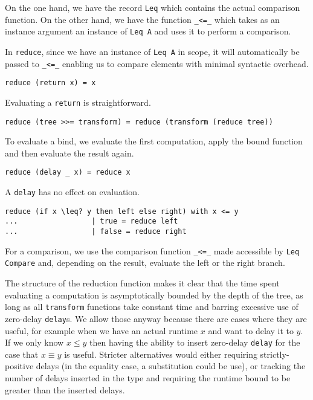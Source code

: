 On the one hand, we have the record \texttt{Leq} which contains the actual comparison function. On the other hand, we have the function \texttt{\_<=\_} which takes as an instance argument an instance of \texttt{Leq A} and uses it to perform a comparison.

In \texttt{reduce}, since we have an instance of \texttt{Leq A} in scope, it will automatically be passed to \texttt{\_<=\_} enabling us to compare elements with minimal syntactic overhead.


\begin{lstlisting}[caption={Evaluating returns},label={lst:dectree-eval:2},emph={reduce,DecTree,return}]
reduce (return x) = x
\end{lstlisting}

Evaluating a \texttt{return} is straightforward.


\begin{lstlisting}[caption={Evaluating bindings},label={lst:dectree-eval:3},emph={reduce,DecTree}]
reduce (tree >>= transform) = reduce (transform (reduce tree))
\end{lstlisting}

To evaluate a bind, we evaluate the first computation, apply the bound function and then evaluate the result again.

\begin{lstlisting}[caption={Evaluating delays},label={lst:dectree-eval:4},emph={reduce,DecTree,delay}]
reduce (delay _ x) = reduce x
\end{lstlisting}

A \texttt{delay} has no effect on evaluation.

\begin{lstlisting}[caption={Evaluating branches},label={lst:dectree-eval:5},emph={reduce,DecTree,if,then,else}]
reduce (if x \leq? y then left else right) with x <= y
...                 | true = reduce left
...                 | false = reduce right
\end{lstlisting}

For a comparison, we use the comparison function \texttt{\_<=\_} made accessible by \texttt{Leq Compare} and, depending on the result, evaluate the left or the right branch.

The structure of the reduction function makes it clear that the time spent evaluating a computation is asymptotically bounded by the depth of the tree, as long as all \texttt{transform} functions take constant time and barring excessive use of zero-delay \texttt{delay}s. We allow those anyway because there are cases where they are useful, for example when we have an actual runtime $x$ and want to delay it to $y$. If we only know $x \leq y$ then having the ability to insert zero-delay \texttt{delay} for the case that $x \equiv y$ is useful. Stricter alternatives would either requiring strictly-positive delays (in the equality case, a substitution could be use), or tracking the number of delays inserted in the type and requiring the runtime bound to be greater than the inserted delays.


